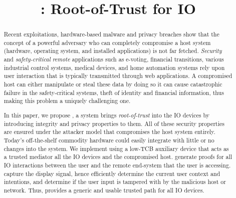 

\newif\ifpaper
\papertrue


\newif\ifdesperatetime

\graphicspath{{images/}}


\title{\name: Root-of-Trust for IO}

\maketitle

\begin{abstract}
 
Recent exploitations, hardware-based malware and privacy breaches show that the concept of a powerful adversary who can completely compromise a host system (hardware, operating system, and installed applications) is not far fetched. \emph{Security} and \emph{safety-critical} \emph{remote} applications such as e-voting, financial transitions, various industrial control systems, medical devices, and home automation systems rely upon user interaction that is typically transmitted through web applications. A compromised host can either manipulate or steal these data by doing so it can cause catastrophic failure in the safety-critical systems, theft of identity and financial information, thus making this problem a uniquely challenging one.

In this paper, we propose \name, a system brings \emph{root-of-trust} into the IO devices by introducing integrity and privacy properties to them. All of these security properties are ensured under the attacker model that compromises the host system entirely. Today's off-the-shelf commodity hardware could easily integrate \name with little or no changes into the system. We implement \name using a low-TCB auxiliary device that acts as a trusted mediator all the IO devices and the compromised host. \name generate proofs for all IO interactions between the user and the remote end-system that the user is accessing. \name capture the display signal, hence efficiently determine the current user context and intentions, and determine if the user input is tampered with by the malicious host or network. Thus, \name provides a generic and usable trusted path for all IO devices.

\end{abstract}





%



%

%


%


\appendix



